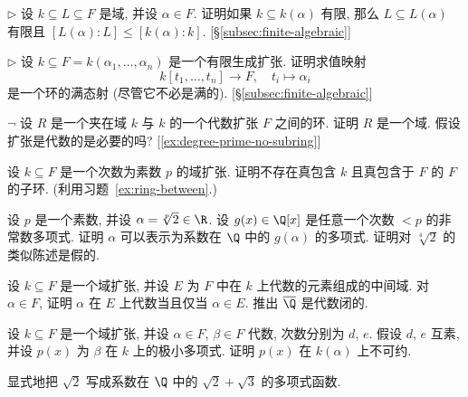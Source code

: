 \begin{prob}\label{ex:tower-fg}
$\triangleright$ 设 $k\subseteq L\subseteq F$ 是域, 并设 $\alpha\in F$. 证明如果 $k\subseteq k(\alpha)$ 有限, 那么 $L\subseteq L(\alpha)$ 有限且 $[L(\alpha):L]\leq [k(\alpha):k]$. [§\ref{subsec:finite-algebraic}]
\end{prob}

\begin{prob}\label{ex:eval-epi}
$\triangleright$ 设 $k\subseteq F=k(\alpha_1,\ldots,\alpha_n)$ 是一个有限生成扩张. 证明求值映射
\[
k[t_1,\dots,t_n]\to F,\quad t_i\mapsto\alpha_i
\]
是一个环的满态射 (尽管它不必是满的). [§\ref{subsec:finite-algebraic}]
\end{prob}

\begin{prob}\label{ex:ring-between}
$\neg$ 设 $R$ 是一个夹在域 $k$ 与 $k$ 的一个代数扩张 $F$ 之间的环. 证明 $R$ 是一个域.
假设扩张是代数的是必要的吗? [\ref{ex:degree-prime-no-subring}]
\end{prob}

\begin{prob}\label{ex:degree-prime-no-subring}
设 $k\subseteq F$ 是一个次数为素数 $p$ 的域扩张. 证明不存在真包含 $k$ 且真包含于 $F$ 的 $F$ 的子环. (利用习题~\ref{ex:ring-between}.)
\end{prob}

\begin{prob}\label{ex:poly-in-g}
设 $p$ 是一个素数, 并设 $\alpha=\sqrt[p]{2}\in\R$. 设 $g(x)\in\Q[x]$ 是任意一个次数 $<p$ 的非常数多项式. 证明 $\alpha$ 可以表示为系数在 $\Q$ 中的 $g(\alpha)$ 的多项式.
证明对 $\sqrt[4]{2}$ 的类似陈述是假的.
\end{prob}

\begin{prob}\label{ex:algebraic-closure-E}
设 $k\subseteq F$ 是一个域扩张, 并设 $E$ 为 $F$ 中在 $k$ 上代数的元素组成的中间域. 对 $\alpha\in F$, 证明 $\alpha$ 在 $E$ 上代数当且仅当 $\alpha\in E$. 推出 $\overline{\Q}$ 是代数闭的.
\end{prob}

\begin{prob}\label{ex:minpoly-irred-kalpha}
设 $k\subseteq F$ 是一个域扩张, 并设 $\alpha\in F$, $\beta\in F$ 代数, 次数分别为 $d$, $e$. 假设 $d$, $e$ 互素, 并设 $p(x)$ 为 $\beta$ 在 $k$ 上的极小多项式. 证明 $p(x)$ 在 $k(\alpha)$ 上不可约.
\end{prob}

\begin{prob}\label{ex:sqrt2-poly-sqrt2-sqrt3}
显式地把 $\sqrt{2}$ 写成系数在 $\Q$ 中的 $\sqrt{2}+\sqrt{3}$ 的多项式函数.
\end{prob}

